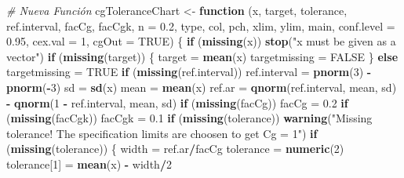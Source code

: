 \documentclass[
]{book}
\newenvironment{Shaded}{\begin{snugshade}}{\end{snugshade}}
\newcommand{\AttributeTok}[1]{\textcolor[rgb]{0.13,0.29,0.53}{#1}}
\newcommand{\CommentTok}[1]{\textcolor[rgb]{0.56,0.35,0.01}{\textit{#1}}}
\newcommand{\ConstantTok}[1]{\textcolor[rgb]{0.56,0.35,0.01}{#1}}
\newcommand{\ControlFlowTok}[1]{\textcolor[rgb]{0.13,0.29,0.53}{\textbf{#1}}}
\newcommand{\DecValTok}[1]{\textcolor[rgb]{0.00,0.00,0.81}{#1}}
\newcommand{\FloatTok}[1]{\textcolor[rgb]{0.00,0.00,0.81}{#1}}
\newcommand{\FunctionTok}[1]{\textcolor[rgb]{0.13,0.29,0.53}{\textbf{#1}}}
\newcommand{\NormalTok}[1]{#1}
\newcommand{\OtherTok}[1]{\textcolor[rgb]{0.56,0.35,0.01}{#1}}
\newcommand{\SpecialCharTok}[1]{\textcolor[rgb]{0.81,0.36,0.00}{\textbf{#1}}}
\newcommand{\StringTok}[1]{\textcolor[rgb]{0.31,0.60,0.02}{#1}}
\begin{document}
\begin{Shaded}
\begin{Highlighting}[]
\CommentTok{\# Nueva Función}
\NormalTok{cgToleranceChart }\OtherTok{\textless{}{-}} \ControlFlowTok{function}\NormalTok{ (x, target, tolerance, ref.interval, facCg, facCgk, }
                              \AttributeTok{n =} \FloatTok{0.2}\NormalTok{, type, col, pch, xlim, ylim, main, }\AttributeTok{conf.level =} \FloatTok{0.95}\NormalTok{, }
                              \AttributeTok{cex.val =} \DecValTok{1}\NormalTok{, }\AttributeTok{cgOut =} \ConstantTok{TRUE}\NormalTok{) }
\NormalTok{\{}
  \ControlFlowTok{if}\NormalTok{ (}\FunctionTok{missing}\NormalTok{(x)) }
    \FunctionTok{stop}\NormalTok{(}\StringTok{"x must be given as a vector"}\NormalTok{)}
  \ControlFlowTok{if}\NormalTok{ (}\FunctionTok{missing}\NormalTok{(target)) \{}
\NormalTok{    target }\OtherTok{=} \FunctionTok{mean}\NormalTok{(x)}
\NormalTok{    targetmissing }\OtherTok{=} \ConstantTok{FALSE}
\NormalTok{  \}}
  \ControlFlowTok{else}\NormalTok{ targetmissing }\OtherTok{=} \ConstantTok{TRUE}
  \ControlFlowTok{if}\NormalTok{ (}\FunctionTok{missing}\NormalTok{(ref.interval)) }
\NormalTok{    ref.interval }\OtherTok{=} \FunctionTok{pnorm}\NormalTok{(}\DecValTok{3}\NormalTok{) }\SpecialCharTok{{-}} \FunctionTok{pnorm}\NormalTok{(}\SpecialCharTok{{-}}\DecValTok{3}\NormalTok{)}
\NormalTok{  sd }\OtherTok{=} \FunctionTok{sd}\NormalTok{(x)}
\NormalTok{  mean }\OtherTok{=} \FunctionTok{mean}\NormalTok{(x)}
\NormalTok{  ref.ar }\OtherTok{=} \FunctionTok{qnorm}\NormalTok{(ref.interval, mean, sd) }\SpecialCharTok{{-}} \FunctionTok{qnorm}\NormalTok{(}\DecValTok{1} \SpecialCharTok{{-}}\NormalTok{ ref.interval, }
\NormalTok{                                                 mean, sd)}
  \ControlFlowTok{if}\NormalTok{ (}\FunctionTok{missing}\NormalTok{(facCg)) }
\NormalTok{    facCg }\OtherTok{=} \FloatTok{0.2}
  \ControlFlowTok{if}\NormalTok{ (}\FunctionTok{missing}\NormalTok{(facCgk)) }
\NormalTok{    facCgk }\OtherTok{=} \FloatTok{0.1}
  \ControlFlowTok{if}\NormalTok{ (}\FunctionTok{missing}\NormalTok{(tolerance)) }
    \FunctionTok{warning}\NormalTok{(}\StringTok{"Missing tolerance! The specification limits are choosen to get Cg = 1"}\NormalTok{)}
  \ControlFlowTok{if}\NormalTok{ (}\FunctionTok{missing}\NormalTok{(tolerance)) \{}
\NormalTok{    width }\OtherTok{=}\NormalTok{ ref.ar}\SpecialCharTok{/}\NormalTok{facCg}
\NormalTok{    tolerance }\OtherTok{=} \FunctionTok{numeric}\NormalTok{(}\DecValTok{2}\NormalTok{)}
\NormalTok{    tolerance[}\DecValTok{1}\NormalTok{] }\OtherTok{=} \FunctionTok{mean}\NormalTok{(x) }\SpecialCharTok{{-}}\NormalTok{ width}\SpecialCharTok{/}\DecValTok{2}

\end{Highlighting}
\end{Shaded}
\end{document}
